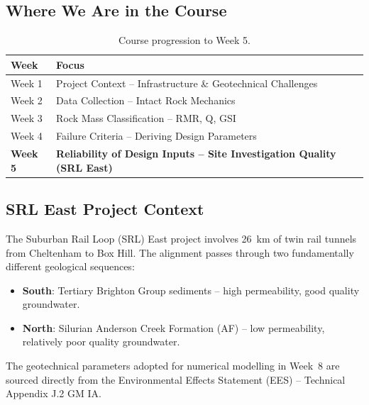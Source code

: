 \documentclass[a4paper,12pt]{article}
\begin{document}
\subsection{Where We Are in the Course}
\begin{table}[h!]
\centering
\begin{tabularx}{\textwidth}{l X}
\toprule
\textbf{Week} & \textbf{Focus} \\
\midrule
Week 1 & Project Context -- Infrastructure \& Geotechnical Challenges \\
Week 2 & Data Collection -- Intact Rock Mechanics \\
Week 3 & Rock Mass Classification -- RMR, Q, GSI \\
Week 4 & Failure Criteria -- Deriving Design Parameters \\
\textbf{Week 5} & \textbf{Reliability of Design Inputs -- Site Investigation Quality (SRL East)} \\
\bottomrule
\end{tabularx}
\caption{Course progression to Week 5.}
\end{table}

\subsection{SRL East Project Context}
The Suburban Rail Loop (SRL) East project involves 26~km of twin rail tunnels from Cheltenham to Box Hill. The alignment passes through two fundamentally different geological sequences:

\begin{itemize}
    \item \textbf{South}: Tertiary Brighton Group sediments -- high permeability, good quality groundwater.
    \item \textbf{North}: Silurian Anderson Creek Formation (AF) -- low permeability, relatively poor quality groundwater.
\end{itemize}

The geotechnical parameters adopted for numerical modelling in Week~8 are sourced directly from the Environmental Effects Statement (EES) -- Technical Appendix J.2 GM IA.
\end{document}
